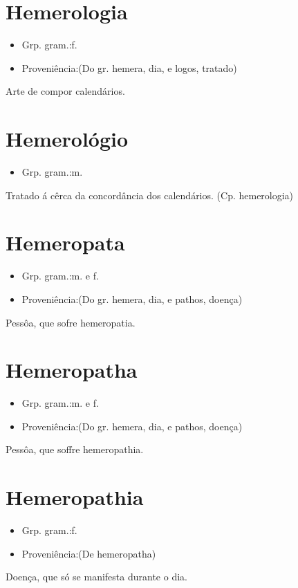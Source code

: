 \documentclass{article}
\begin{document}
\section{Hemerologia}
\begin{itemize}
\item {Grp. gram.:f.}
\end{itemize}
\begin{itemize}
\item {Proveniência:(Do gr. \textunderscore hemera\textunderscore , dia, e \textunderscore logos\textunderscore , tratado)}
\end{itemize}
Arte de compor calendários.
\section{Hemerológio}
\begin{itemize}
\item {Grp. gram.:m.}
\end{itemize}
Tratado á cêrca da concordância dos calendários.
(Cp. \textunderscore hemerologia\textunderscore )
\section{Hemeropata}
\begin{itemize}
\item {Grp. gram.:m.  e  f.}
\end{itemize}
\begin{itemize}
\item {Proveniência:(Do gr. \textunderscore hemera\textunderscore , dia, e \textunderscore pathos\textunderscore , doença)}
\end{itemize}
Pessôa, que sofre hemeropatia.
\section{Hemeropatha}
\begin{itemize}
\item {Grp. gram.:m.  e  f.}
\end{itemize}
\begin{itemize}
\item {Proveniência:(Do gr. \textunderscore hemera\textunderscore , dia, e \textunderscore pathos\textunderscore , doença)}
\end{itemize}
Pessôa, que soffre hemeropathia.
\section{Hemeropathia}
\begin{itemize}
\item {Grp. gram.:f.}
\end{itemize}
\begin{itemize}
\item {Proveniência:(De \textunderscore hemeropatha\textunderscore )}
\end{itemize}
Doença, que só se manifesta durante o dia.
\end{document}
